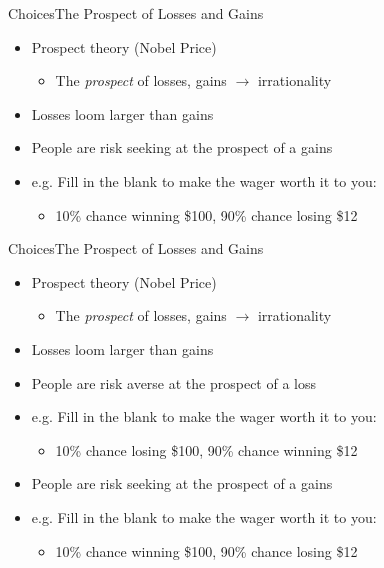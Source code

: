 \documentclass{beamer}
\begin{document}
\begin{frame}{Choices}{The Prospect of Losses and Gains}
  \begin{itemize}
  \addtolength{\itemsep}{0.5\baselineskip}
  \item Prospect theory (Nobel Price) 
        \begin{itemize}
        \item The {\it prospect} of losses, gains $\rightarrow$ irrationality
        \end{itemize}
  \item Losses loom larger than gains
  \item People are risk seeking at the prospect of a gains
  \item e.g. Fill in the blank to make the wager worth it to you:
        \begin{itemize}
        \item 10\% chance winning \$100, 90\% chance losing \$12
        \end{itemize}
  \end{itemize}

\end{frame}


\begin{frame}{Choices}{The Prospect of Losses and Gains}

  \begin{itemize}
  \addtolength{\itemsep}{0.5\baselineskip}
  \item Prospect theory (Nobel Price) 
        \begin{itemize}
        \item The {\it prospect} of losses, gains $\rightarrow$ irrationality
        \end{itemize}
  \item Losses loom larger than gains
  \item People are risk averse at the prospect of a loss
  \item e.g. Fill in the blank to make the wager worth it to you:
        \begin{itemize}
        \item 10\% chance losing \$100, 90\% chance winning \$12
        \end{itemize}
  \item People are risk seeking at the prospect of a gains
  \item e.g. Fill in the blank to make the wager worth it to you:
        \begin{itemize}
        \item 10\% chance winning \$100, 90\% chance losing \$12
        \end{itemize}
  \end{itemize}

\end{frame}
\end{document}
